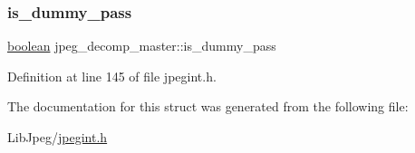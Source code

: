 \subsubsection{\texorpdfstring{is\_dummy\_pass}{is\_dummy\_pass}}
{\footnotesize\ttfamily \mbox{\hyperlink{jmorecfg_8h_a7c6368b321bd9acd0149b030bb8275ed}{boolean}} jpeg\+\_\+decomp\+\_\+master\+::is\+\_\+dummy\+\_\+pass}



Definition at line 145 of file jpegint.\+h.



The documentation for this struct was generated from the following file\+:\begin{DoxyCompactItemize}
\item 
Lib\+Jpeg/\mbox{\hyperlink{jpegint_8h}{jpegint.\+h}}\end{DoxyCompactItemize}
